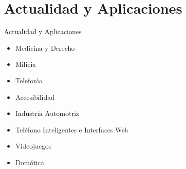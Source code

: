 \section{Actualidad y Aplicaciones}

\begin{frame}{Actualidad y Aplicaciones}
\begin{itemize}
	\item{Medicina y Derecho}
	\item{Milicia}
	\item{Telefon{\'\i}a}
	\item{Accesibilidad}
	\item{Industria Automotriz}
	\item{Tel\'efono Inteligentes e Interfaces Web}
	\item{Videojuegos}
	\item{Dom\'otica} 
\end{itemize}
\end{frame}
